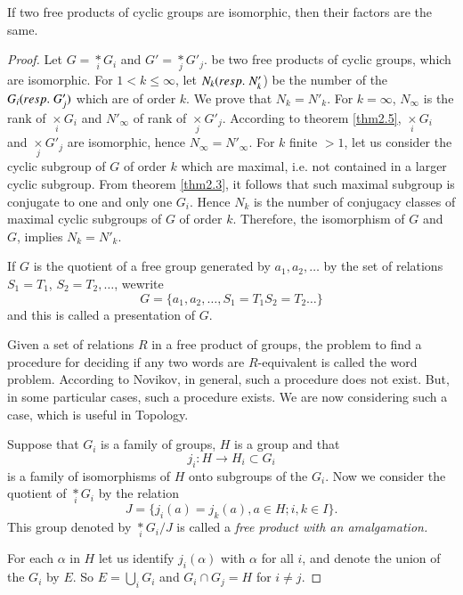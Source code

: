 \begin{theorem}\label{thm2.6} %
If two free products of cyclic groups are isomorphic, then their
factors are the same. 
\end{theorem}

\begin{proof}
Let $G = \underset{i}\ast G_i$ and $G'=\underset{j}\ast G'_j$. be two free
products of cyclic groups, which are isomorphic. For $1 < k \leq
\infty$, let $N_k ({resp.}\kern.3em N'_k$) be the number of the $G_i({resp.}\kern.3em G'_j)$
which are of order $k$. We prove that $N_k=N'_k$. For $k= \infty$,
$N_\infty$ is the rank of $\underset{i}\times G_i$ and $N'_\infty$ of 
rank of $\underset{j}\times G'_j$. According to theorem \ref{thm2.5},
$\underset{i}\times G_i$ and $\underset{j}\times G'_j$ are
isomorphic, hence $N_\infty = N'_\infty$. For $k$ finite $>1$, let us
consider the cyclic subgroup of $G$ of order $k$ which are maximal,
i.e. not contained in a larger cyclic subgroup. From theorem \ref{thm2.3}, it
follows that such maximal subgroup is conjugate to one and only one
$G_i$. Hence $N_k$ is the number of conjugacy classes of maximal
cyclic subgroups of $G$ of order $k$. Therefore, the isomorphism of
$G$ and $G$, implies $N_k= N'_k$. 

If $G$ is the quotient of a free group generated by $a_1, a_2,
\ldots$ by the set of relations $S_1 = T_1$, $S_2 = T_2, \ldots$,
we\pageoriginale write 
$$
G= \{ a_1, a_2, \ldots, S_1 = T_1 S_2 = T_2 \ldots \} 
$$
and this is called a presentation of $G$.

Given a set of relations $R$ in a free product of groups, the problem
to find a procedure for deciding if any two words are $R$-equivalent
is called the word problem. According to Novikov, in general, such a
procedure does not exist. But, in some particular cases, such a
procedure exists. We are now considering such a case, which is useful
in Topology. 

Suppose that $G_i$ is a family of groups, $H$ is a group and that  
$$
j_i : H \to H_i \subset  G_i
$$
is a family of isomorphisms of $H$ onto subgroups of the $G_i$. Now we
consider the quotient of $\underset{i}{\ast} G_i$ by the relation  
$$
J= \{ j_i (a) = j_k (a), a \in H; i, k \in I \}. 
$$
This group denoted by $\underset{i}{\ast} G_i / J$ is called a
\textit{free product with an amalgamation.} 

For each $\alpha$ in $H$ let us identify $j_i(\alpha)$ with $\alpha$
for all $i$, and denote the union of the $G_i$ by $E$. So $E =
\bigcup\limits_i G_i$ and $G_i \cap G_j = H$ for $i \neq  
j$. 


\end{proof}
